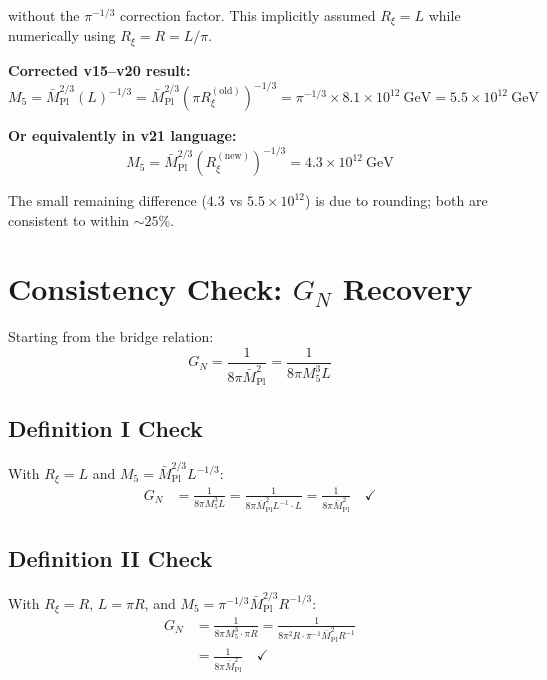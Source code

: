 \documentclass[11pt,a4paper]{article}
\newcommand{\Rxi}{R_\xi}
\newcommand{\Mplbar}{\bar{M}_{\mathrm{Pl}}}
\newcommand{\Mfive}{M_5}
\newcommand{\GN}{G_N}
\begin{document}
without the $\pi^{-1/3}$ correction factor. This implicitly assumed $\Rxi = L$
while numerically using $\Rxi = R = L/\pi$.

\textbf{Corrected v15--v20 result:}
\begin{equation}
\Mfive = \Mplbar^{2/3} (L)^{-1/3} = \Mplbar^{2/3} (\pi \Rxi^{(\mathrm{old})})^{-1/3}
= \pi^{-1/3} \times 8.1 \times 10^{12}~\mathrm{GeV} = 5.5 \times 10^{12}~\mathrm{GeV}
\label{eq:v15-corrected}
\end{equation}

\textbf{Or equivalently in v21 language:}
\begin{equation}
\Mfive = \Mplbar^{2/3} (\Rxi^{(\mathrm{new})})^{-1/3} = 4.3 \times 10^{12}~\mathrm{GeV}
\label{eq:v21-result}
\end{equation}

The small remaining difference ($4.3$ vs $5.5 \times 10^{12}$) is due to rounding;
both are consistent to within $\sim 25\%$.

\section{Consistency Check: $\GN$ Recovery}

Starting from the bridge relation:
\begin{equation}
\GN = \frac{1}{8\pi \Mplbar^2} = \frac{1}{8\pi \Mfive^3 L}
\label{eq:GN-from-bridge}
\end{equation}

\subsection{Definition I Check}

With $\Rxi = L$ and $\Mfive = \Mplbar^{2/3} L^{-1/3}$:
\begin{align}
\GN &= \frac{1}{8\pi \Mfive^3 L} = \frac{1}{8\pi \Mplbar^2 L^{-1} \cdot L}
= \frac{1}{8\pi \Mplbar^2} \quad \checkmark
\label{eq:GN-check-I}
\end{align}

\subsection{Definition II Check}

With $\Rxi = R$, $L = \pi R$, and $\Mfive = \pi^{-1/3} \Mplbar^{2/3} R^{-1/3}$:
\begin{align}
\GN &= \frac{1}{8\pi \Mfive^3 \cdot \pi R} = \frac{1}{8\pi^2 R \cdot \pi^{-1} \Mplbar^2 R^{-1}} \nonumber\\
&= \frac{1}{8\pi \Mplbar^2} \quad \checkmark
\label{eq:GN-check-II}
\end{align}
\end{document}
